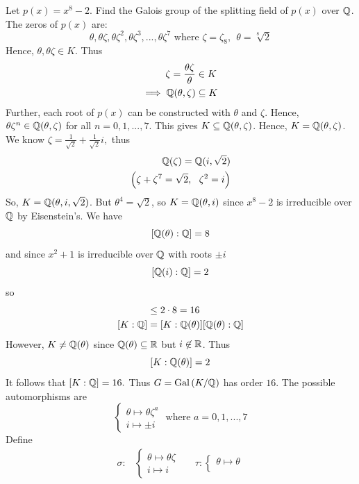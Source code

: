 \begin{example}
    Let $p(x) = x^8-2$. Find the Galois group of the splitting field of $p(x)$ over $\mathbb{Q}$. The zeros of $p(x)$ are:
    $$\theta, \theta \zeta, \theta \zeta^2, \theta \zeta^3, ..., \theta \zeta^7 \text{ where } \zeta = \zeta_8, ~~ \theta = \sqrt[8]{2}$$
    Hence, $\theta, \theta \zeta \in K.$ Thus
    \begin{align*}
        \zeta = \dfrac{\theta \zeta}{\theta} &\in K \\
        \implies \mathbb{Q}(\theta, \zeta) &\subseteq K
    \end{align*}
    Further, each root of $p(x)$ can be constructed with $\theta$ and $\zeta$. Hence, $\theta \zeta^n \in \mathbb{Q}(\theta, \zeta)$ for all $n=0,1,..., 7.$ This gives $K \subseteq \mathbb{Q}(\theta, \zeta)$. Hence, $K = \mathbb{Q}(\theta, \zeta)$. We know $\zeta = \frac{1}{\sqrt{2}} + \frac{1}{\sqrt{2}}i,$ thus
    \begin{align*}
        \mathbb{Q}(\zeta) = \mathbb{Q}(i, \sqrt{2}) \\ 
        \left(\zeta + \zeta^7 = \sqrt{2}, ~~\zeta^2 = i\right)
    \end{align*}
    So, $K=\mathbb{Q}(\theta, i, \sqrt{2})$. But $\theta^4 = \sqrt{2}$, so $K = \mathbb{Q}(\theta, i)$ since $x^8-2$ is irreducible over $\mathbb{Q}$ by Eisenstein's. We have
    $$[\mathbb{Q}(\theta) : \mathbb{Q}] = 8$$
    and since $x^2+1$ is irreducible over $\mathbb{Q}$ with roots $\pm i$
    $$[\mathbb{Q}(i) : \mathbb{Q}] = 2$$
    so
    \begin{align*}
        [K : \Q] &\leq 2 \cdot 8 = 16 \\
        [K : \Q] &= [K : \Q(\theta)][\Q(\theta) : \Q]
    \end{align*}
    However, $K \neq \mathbb{Q}(\theta)$ since $\mathbb{Q}(\theta) \subseteq \mathbb{R}$ but $i \not \in \mathbb{R}$. Thus
    $$[K : \mathbb{Q}(\theta)] = 2$$
    It follows that $[K : \mathbb{Q}] = 16.$ Thus $G = \text{Gal}\left(K/\mathbb{Q}\right)$ has order $16$. The possible automorphisms are
    $$\begin{cases*}
        \theta \mapsto \theta \zeta^a \\
        i \mapsto \pm i
    \end{cases*} \text{ where } a = 0,1,..., 7$$
    Define
    \begin{align*}
        \sigma: &\begin{cases*}
            \theta \mapsto \theta \zeta \\
            i \mapsto i
        \end{cases*} &&
        \tau: \begin{cases*}
            \theta \mapsto \theta \\

\end{cases*}
\end{align*}
\end{example}
